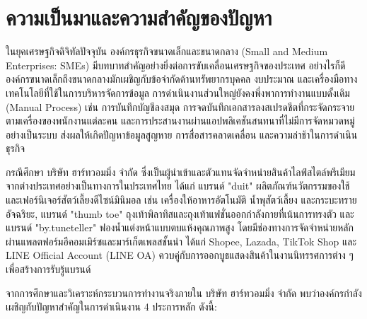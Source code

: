 
\providecommand{\decitem}[2]{%
  \par\noindent\hangindent=3.6em\hangafter=1\hspace*{1.3em}#1\hspace{0.5em}#2\par\vspace{0.25em}%
}
\providecommand{\subdecitem}[2]{%
  \par\noindent\hangindent=5.8em\hangafter=1\hspace*{2.0em}#1\hspace{0.5em}#2\par\vspace{0.22em}%
}

\section{ความเป็นมาและความสำคัญของปัญหา}
\hspace*{1.3em}
ในยุคเศรษฐกิจดิจิทัลปัจจุบัน องค์กรธุรกิจขนาดเล็กและขนาดกลาง (Small and Medium Enterprises: SMEs) มีบทบาทสำคัญอย่างยิ่งต่อการขับเคลื่อนเศรษฐกิจของประเทศ อย่างไรก็ดี องค์กรขนาดเล็กถึงขนาดกลางมักเผชิญกับข้อจำกัดด้านทรัพยากรบุคคล งบประมาณ และเครื่องมือทางเทคโนโลยีที่ใช้ในการบริหารจัดการข้อมูล การดำเนินงานส่วนใหญ่ยังคงพึ่งพาการทำงานแบบดั้งเดิม (Manual Process) เช่น การบันทึกบัญชีลงสมุด การจดบันทึกเอกสารลงสเปรดชีตที่กระจัดกระจายตามเครื่องของพนักงานแต่ละคน และการประสานงานผ่านแอปพลิเคชันสนทนาที่ไม่มีการจัดหมวดหมู่อย่างเป็นระบบ ส่งผลให้เกิดปัญหาข้อมูลสูญหาย การสื่อสารคลาดเคลื่อน และความล่าช้าในการดำเนินธุรกิจ

\hspace*{1.3em}
กรณีศึกษา บริษัท ฮาร์ทวอมมิ่ง จำกัด ซึ่งเป็นผู้นำเข้าและตัวแทนจัดจำหน่ายสินค้าไลฟ์สไตล์พรีเมียมจากต่างประเทศอย่างเป็นทางการในประเทศไทย ได้แก่ แบรนด์ "duit" ผลิตภัณฑ์นวัตกรรมของใช้และเฟอร์นิเจอร์สัตว์เลี้ยงดีไซน์มินิมอล เช่น เครื่องให้อาหารอัตโนมัติ น้ำพุสัตว์เลี้ยง และกระบะทรายอัจฉริยะ, แบรนด์ "thumb toe" ถุงเท้าพิลาทิสและถุงเท้าแฟชั่นออกกำลังกายที่เน้นการทรงตัว และแบรนด์ "by.tuneteller" ฟองน้ำแต่งหน้าแบบตบแห้งคุณภาพสูง โดยมีช่องทางการจัดจำหน่ายหลักผ่านแพลตฟอร์มอีคอมเมิร์ซและมาร์เก็ตเพลสชั้นนำ ได้แก่ Shopee, Lazada, TikTok Shop และ LINE Official Account (LINE OA) ควบคู่กับการออกบูธแสดงสินค้าในงานนิทรรศการต่าง ๆ เพื่อสร้างการรับรู้แบรนด์

\hspace*{1.3em}
จากการศึกษาและวิเคราะห์กระบวนการทำงานจริงภายใน บริษัท ฮาร์ทวอมมิ่ง จำกัด พบว่าองค์กรกำลังเผชิญกับปัญหาสำคัญในการดำเนินงาน 4 ประการหลัก ดังนี้:

